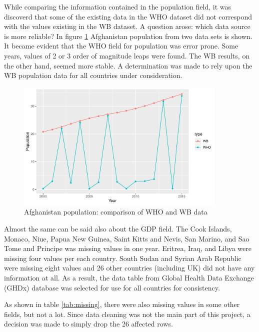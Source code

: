 While comparing the information contained in the population field, it was discoverd that some of the existing data in the WHO dataset did not correspond with the values existing in the WB dataset. A question arose: which data source is more reliable? In figure \ref{fig:afghanistan_pop_comparison} Afghanistan population from two data sets is shown. It became evident that the WHO field for population was error prone. Some years, values of 2 or 3 order of magnitude leaps were found. The WB results, on the other hand, seemed more stable. A determination was made to rely upon the WB population data for all countries under consideration.


\begin{figure}
  \centering
  \includegraphics[width = 0.9\textwidth]{figures/Afghanistan_population_comparison}
  \caption{Afghanistan population: comparison of WHO and WB data}
  \label{fig:afghanistan_pop_comparison}
\end{figure}

Almost the same can be said also about the GDP field. The Cook Islands, Monaco, Niue, Papua New Guinea, Saint Kitts and Nevis, San Marino, and Sao Tome and Principe was missing values in one year. Eritrea, Iraq, and Libya were missing four values per each country. South Sudan and Syrian Arab Republic were missing eight values and 26 other countries (including UK) did not have any information at all. As a result, the data table from Global Health Data Exchange (GHDx) database \cite{GHDx} was selected for use for all countries for consistency.

As shown in table \ref{tab:missing}, there were also missing values in some other fields, but not a lot. Since data cleaning was not the main part of this project, a decision was made to simply drop the 26 affected rows.








